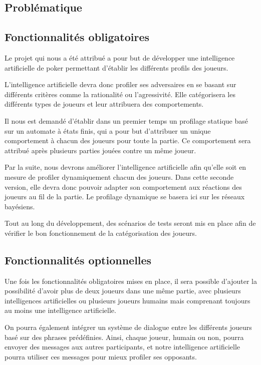 \documentclass{report}
\begin{document}
\subsection{Problématique}
\subsection{Fonctionnalités obligatoires}

\hspace{0.5cm}Le projet qui nous a été attribué a pour but de développer une intelligence artificielle de poker permettant d'établir les différents profils des joueurs.\par
L'intelligence artificielle devra donc profiler ses adversaires en se basant sur différents critères comme la rationalité ou l'agressivité. Elle catégorisera les différents types de joueurs et leur attribuera des comportements.\par
Il nous est demandé d'établir dans un premier temps un profilage statique basé sur un automate à états finis, qui a pour but d'attribuer un unique comportement à chacun des joueurs pour toute la partie. Ce comportement sera attribué après plusieurs parties jouées contre un même joueur.\par
Par la suite, nous devrons améliorer l'intelligence artificielle afin qu'elle soit en mesure de profiler dynamiquement chacun des joueurs. Dans cette seconde version, elle devra donc pouvoir adapter son comportement aux réactions des joueurs au fil de la partie. Le profilage dynamique se basera ici sur les réseaux bayésiens.\par
Tout au long du développement, des scénarios de tests seront mis en place afin de vérifier le bon fonctionnement de la catégorisation des joueurs.

\subsection{Fonctionnalités optionnelles}

\hspace{0.5cm}Une fois les fonctionnalités obligatoires mises en place, il sera possible d'ajouter la possibilité d'avoir plus de deux joueurs dans une même partie, avec plusieurs intelligences artificielles ou plusieurs joueurs humains mais comprenant toujours au moins une intelligence artificielle.\par
On pourra également intégrer un système de dialogue entre les différents joueurs basé sur des phrases prédéfinies. Ainsi, chaque joueur, humain ou non, pourra envoyer des messages aux autres participants, et notre intelligence artificielle pourra utiliser ces messages pour mieux profiler ses opposants.\par 
\end{document}
